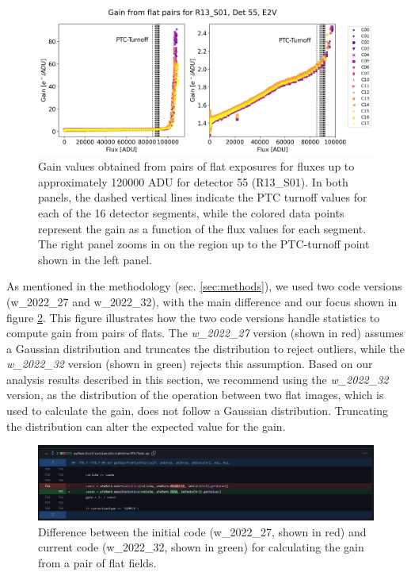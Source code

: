  \begin{figure}[!htb]
    \centering
    \includegraphics[width=\textwidth]{Figures/Gain_plot_55.png}
    \caption{Gain values obtained from pairs of flat exposures for fluxes up to approximately 120000 ADU for detector 55 (R13\_S01). In both panels, the dashed vertical lines indicate the PTC turnoff values for each of the 16 detector segments, while the colored data points represent the gain as a function of the flux values for each segment. The right panel zooms in on the region up to the PTC-turnoff point shown in the left panel.}
    \label{fig:Gain_full}
\end{figure}

\vspace{3mm}
As mentioned in the methodology (sec. \ref{sec:methods}), we used two code versions (w\_2022\_27 and w\_2022\_32), with the main difference and our focus shown in figure \ref{fig:diff_codes}. This figure illustrates how the two code versions handle statistics to compute gain from pairs of flats. The \textit{w\_2022\_27} version (shown in red) assumes a Gaussian distribution and truncates the distribution to reject outliers, while the \textit{w\_2022\_32} version (shown in green) rejects this assumption. Based on our analysis results described in this section, we recommend using the \textit{w\_2022\_32} version, as the distribution of the operation between two flat images, which is used to calculate the gain, does not follow a Gaussian distribution. Truncating the distribution can alter the expected value for the gain.


\begin{figure}[!htb]
    \centering
    \includegraphics[width=\textwidth]{Figures/Cambio_codigo.png}
    \caption{Difference between the initial code (w\_2022\_27, shown in red) and current code (w\_2022\_32, shown in green) for calculating the gain from a pair of flat fields.}
    \label{fig:diff_codes}
\end{figure}


